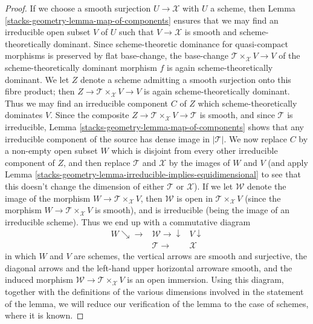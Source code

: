 \begin{proof}
\medskip\noindent
If we choose a smooth surjection $U \to \mathcal{X}$ with $U$ a scheme,
then Lemma \ref{stacks-geometry-lemma-map-of-components} ensures that
we may find an irreducible open subset $V$ of $U$ such
that $V \to \mathcal{X}$ is smooth and scheme-theoretically dominant.
Since scheme-theoretic dominance for quasi-compact morphisms
is preserved by flat base-change,
the base-change $\mathcal{T} \times_{\mathcal{X}} V \to V$
of the scheme-theoretically
dominant morphism $f$ is again
scheme-theoretically dominant.   We let $Z$ denote a scheme
admitting a smooth surjection onto this fibre product;
then $Z \to \mathcal{T} \times_{\mathcal{X}} V \to V$
is again scheme-theoretically dominant.
Thus we may find an irreducible
component $C$ of $Z$ which scheme-theoretically
dominates $V$.
Since the composite  $Z \to \mathcal{T}\times_{\mathcal{X}} V \to \mathcal{T}$
is smooth,
and since $\mathcal{T}$ is irreducible,
Lemma \ref{stacks-geometry-lemma-map-of-components} shows that any irreducible
component of the source has dense image in $|\mathcal{T}|$.
We now replace
$C$ by a non-empty open subset $W$ which is disjoint from every other
irreducible component of $Z$, and
then replace $\mathcal{T}$ and $\mathcal{X}$ by the images of $W$
and $V$
(and apply Lemma \ref{stacks-geometry-lemma-irreducible-implies-equidimensional}
to see that this
doesn't change the dimension of either $\mathcal{T}$ or $\mathcal{X}$).
If we let $\mathcal{W}$ denote the image of the morphism
$W \to \mathcal{T}\times_{\mathcal{X}} V$,
then $\mathcal{W}$ is open in $\mathcal{T}\times_{\mathcal{X}} V$ (since the
morphism $W \to \mathcal{T}\times_{\mathcal{X}} V$ is smooth),
and is irreducible (being the image of an irreducible
scheme).  Thus we end up with a commutative diagram
$$
\begin{array}{ccc}W \searrow\longrightarrow & \mathcal{W} \longrightarrow\downarrow & V \downarrow \\  & \mathcal{T} \longrightarrow & \mathcal{X}\end{array}
$$
in which $W$ and $V$ are schemes,
the vertical arrows are smooth and surjective,
the diagonal arrows and the left-hand
upper horizontal arroware smooth,
and the induced morphism $\mathcal{W} \to \mathcal{T}\times_{\mathcal{X}} V$ is
an open immersion. Using this diagram, together with the definitions
of the various dimensions involved in
the statement of the lemma, we will reduce our verification
of the lemma to the case of schemes, where it is known.


\end{proof}
